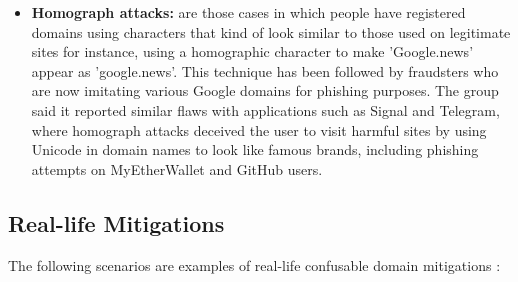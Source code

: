 \begin{itemize}
    \item \textbf{Homograph attacks:} are those cases in which people have registered domains using characters that kind of look similar to those used on legitimate sites for instance, using a homographic character to make 'Google.news' appear as 'google.news'. This technique has been followed by fraudsters who are now imitating various Google domains for phishing purposes. The group said it reported similar flaws with applications such as Signal and Telegram, where homograph attacks deceived the user to visit harmful sites by using Unicode in domain names to look like famous brands, including phishing attempts on MyEtherWallet and GitHub users. \cite{Leyden2021}
\end{itemize}

\subsection{ Real-life Mitigations}

The following scenarios are examples of real-life confusable domain mitigations :

